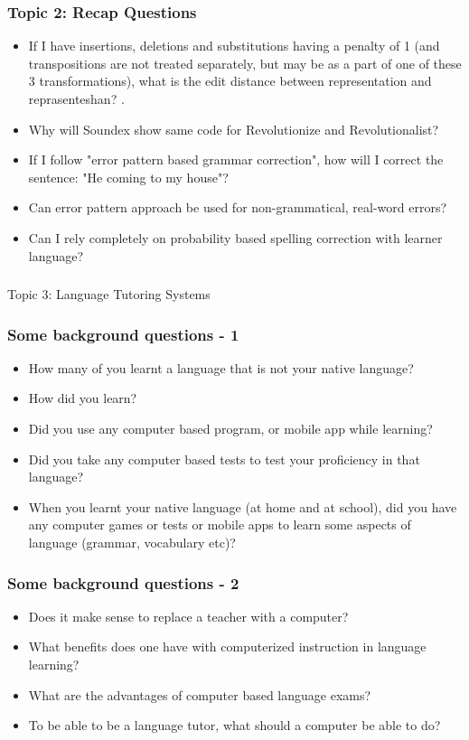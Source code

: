 \documentclass{beamer}
\begin{document}
\begin{frame}
\frametitle{Topic 2: Recap Questions}
\begin{itemize}
\item If I have insertions, deletions and substitutions having a penalty of 1 (and transpositions are not treated separately, but may be as a part of one of these 3 transformations), what is the edit distance between representation and reprasenteshan? .
\item Why will Soundex show same code for Revolutionize and Revolutionalist? \pause
\item If I follow "error pattern based grammar correction", how will I correct the sentence: "He coming to my house"? \pause
\item Can error pattern approach be used for non-grammatical, real-word errors? \pause
\item Can I rely completely on probability based spelling correction with learner language?  
\end{itemize}
\end{frame}

\begin{frame}
\frametitle{}
\begin{center}
\Large Topic 3: Language Tutoring Systems
\end{center}
\end{frame}

\begin{frame}
\frametitle{Some background questions - 1}
\begin{itemize}
\item How many of you learnt a language that is not your native language? \pause
\item How did you learn? 
\item Did you use any computer based program, or mobile app while learning? \pause
\item Did you take any computer based tests to test your proficiency in that language? \pause
\item When you learnt your native language (at home and at school), did you have any computer games or tests or mobile apps to learn some aspects of language (grammar, vocabulary etc)?
\end{itemize}
\end{frame}

\begin{frame}
\frametitle{Some background questions - 2}
\begin{itemize}
\item Does it make sense to replace a teacher with a computer? \pause
\item What benefits does one have with computerized instruction in language learning? \pause
\item What are the advantages of computer based language exams? \pause
\item To be able to be a language tutor, what should a computer be able to do? 
\end{itemize}
\end{frame}
\end{document}

